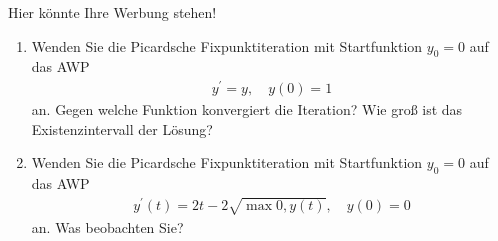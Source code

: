\begin{exercise}
    Hier könnte Ihre Werbung stehen!
    \begin{enumerate}[label = \alph*)]
        \item Wenden Sie die Picardsche Fixpunktiteration mit Startfunktion $y_0 = 0$ auf das AWP 
            \begin{align*}
                y^\prime = y, \quad y(0) = 1
            \end{align*}
            an. Gegen welche Funktion konvergiert die Iteration? Wie groß ist das Existenzintervall der Lösung?

        \item Wenden Sie die Picardsche Fixpunktiteration mit Startfunktion $y_0 = 0$ auf das AWP 
        \begin{align*}
            y^\prime(t) = 2t - 2\sqrt{\max{0, y(t)}}, \quad y(0) = 0
        \end{align*}
        an. Was beobachten Sie?
    \end{enumerate}
\end{exercise}

